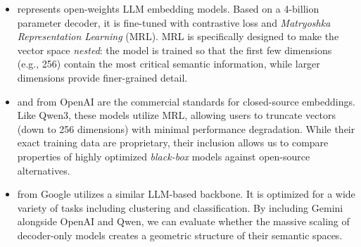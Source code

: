 \begin{itemize}
    \item \qwen{} \citep{qwen3embedding} represents open-weights LLM embedding models. Based on a 4-billion parameter decoder, it is fine-tuned with contrastive loss and \textit{Matryoshka Representation Learning} (MRL). MRL is specifically designed to make the vector space \textit{nested}: the model is trained so that the first few dimensions (e.g., 256) contain the most critical semantic information, while larger dimensions provide finer-grained detail. 
    \item \tetrismall and \tetrilarge{} \citep{gpt4} from OpenAI are the commercial standards for closed-source embeddings. Like Qwen3, these models utilize MRL, allowing users to truncate vectors (down to 256 dimensions) with minimal performance degradation. While their exact training data are proprietary, their inclusion allows us to compare properties of highly optimized \emph{black-box} models against open-source alternatives.
    \item \geminiemb{} \citep{google2023gemini} from Google utilizes a similar LLM-based backbone. It is optimized for a wide variety of tasks including clustering and classification. By including Gemini alongside OpenAI and Qwen, we can evaluate whether the massive scaling of decoder-only models creates a geometric structure of their semantic spaces.
\end{itemize}


